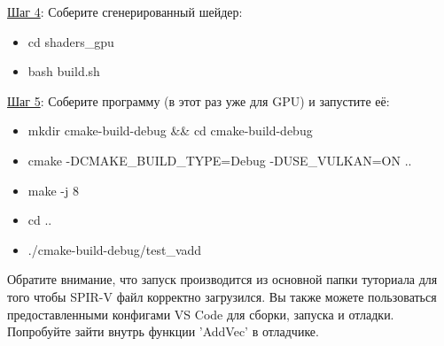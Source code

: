 \documentclass[11pt,fleqn,english,russian]{report} %
\begin{document}
\vspace*{5px}
\noindent\underline{Шаг 4}: Соберите сгенерированный шейдер:
\begin{itemize}
\item cd shaders\_gpu 	
\item bash build.sh
\end{itemize}

\vspace*{5px}
\noindent\underline{Шаг 5}: Соберите программу (в этот раз уже для GPU) и запустите её:
\begin{itemize}
	\item mkdir cmake-build-debug \&\& cd cmake-build-debug
	\item cmake -DCMAKE\_BUILD\_TYPE=Debug -DUSE\_VULKAN=ON ..
	\item make -j 8
	\item cd ..
	\item ./cmake-build-debug/test\_vadd 
\end{itemize}

Обратите внимание, что запуск производится из основной папки туториала для того чтобы SPIR-V файл корректно загрузился. Вы также можете пользоваться предоставленными конфигами VS Code для сборки, запуска и отладки. Попробуйте зайти внутрь функции 'AddVec' в отладчике.


\end{document}
